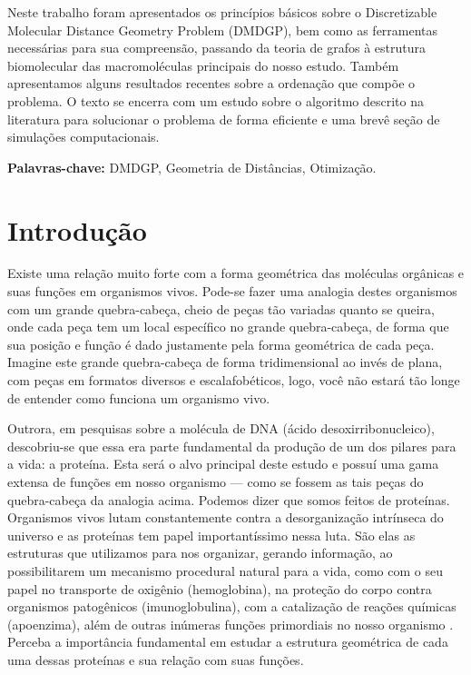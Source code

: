 \documentclass[a4paper,12pt]{article}
\begin{document}
	Neste trabalho foram apresentados os princípios básicos sobre o Discretizable Molecular Distance Geometry Problem (DMDGP), bem como as ferramentas necessárias para sua compreensão, passando da teoria de grafos à estrutura biomolecular das macromoléculas principais do nosso estudo. Também apresentamos alguns resultados recentes sobre a ordenação que compõe o problema. O texto se encerra com um estudo sobre o algoritmo descrito na literatura para solucionar o problema de forma eficiente e uma brevê seção de simulações computacionais.
	
	\textbf{Palavras-chave:} DMDGP, Geometria de Distâncias, Otimização.
	
	
	\newpage
	\section{Introdução}
	Existe uma relação muito forte com a forma geométrica das moléculas orgânicas e suas funções em organismos vivos. Pode-se fazer uma analogia destes organismos com um grande quebra-cabeça, cheio de peças tão variadas quanto se queira, onde cada peça tem um local específico no grande quebra-cabeça, de forma que sua posição e função é dado justamente pela forma geométrica de cada peça. Imagine este grande quebra-cabeça de forma tridimensional ao invés de plana, com peças em formatos diversos e escalafobéticos, logo, você não estará tão longe de entender como funciona um organismo vivo.
	
	Outrora, em pesquisas sobre a molécula de DNA (ácido desoxirribonucleico), descobriu-se que essa era parte fundamental da produção de um dos pilares para a vida: a proteína. Esta será o alvo principal deste estudo e possuí uma gama extensa de funções em nosso organismo --- como se fossem as tais peças do quebra-cabeça da analogia acima. Podemos dizer que somos feitos de proteínas. Organismos vivos lutam constantemente contra a desorganização intrínseca do universo e as proteínas tem papel importantíssimo nessa luta. São elas as estruturas que utilizamos para nos organizar, gerando informação, ao possibilitarem um mecanismo procedural natural para a vida, como com o seu papel no transporte de oxigênio (hemoglobina), na proteção do corpo contra organismos patogênicos (imunoglobulina), com a catalização de reações químicas (apoenzima), além de outras inúmeras funções primordiais no nosso organismo \cite{fidalgotese}. Perceba a importância fundamental em estudar a estrutura geométrica de cada uma dessas proteínas e sua relação com suas funções.
	
\end{document}
